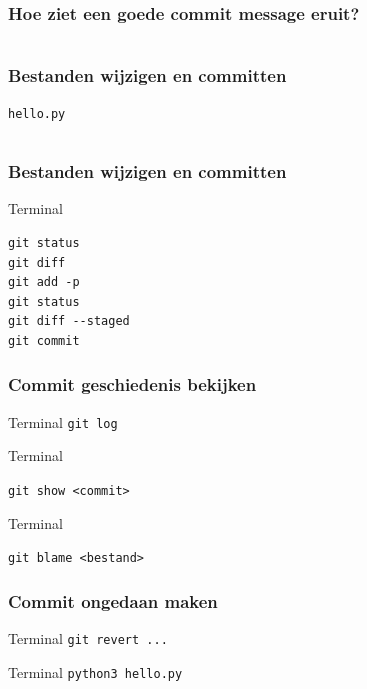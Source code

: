 \documentclass[]{beamer}
\begin{document}
\begin{frame}[plain]
    \frametitle{Hoe ziet een goede commit message eruit?}

    \inputminted[fontsize=\scriptsize]{text}{source/commit-message.txt}
\end{frame}

\begin{frame}[fragile]
    \frametitle{Bestanden wijzigen en committen}

    \texttt{hello.py}
    \inputminted[bgcolor=monokaibg]{python}{source/hello2.py}
\end{frame}

\begin{frame}[fragile]
    \frametitle{Bestanden wijzigen en committen}

    \begin{block}{Terminal}
\begin{verbatim}
git status
git diff
git add -p
git status
git diff --staged
git commit
\end{verbatim}
    \end{block}
\end{frame}

\begin{frame}[fragile]
    \frametitle{Commit geschiedenis bekijken}

    \begin{block}{Terminal}
    \verb/git log/
    \end{block}

    \pause

    \begin{block}{Terminal}

    \verb/git show <commit>/
    \end{block}

    \pause

    \begin{block}{Terminal}

    \verb/git blame <bestand>/
    \end{block}
\end{frame}

\begin{frame}[fragile]
    \frametitle{Commit ongedaan maken}

    \begin{block}{Terminal}
    \verb/git revert .../
    \end{block}

    \pause

    \begin{block}{Terminal}
    \verb/python3 hello.py/
    \end{block}
\end{frame}
\end{document}
